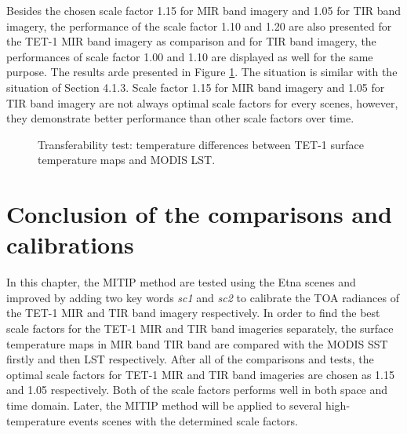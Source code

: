 \noindent Besides the chosen scale factor 1.15 for MIR band imagery and 1.05 for TIR band imagery, the performance of the scale factor 1.10 and 1.20 are also presented for the TET-1 MIR band imagery as comparison and for TIR band imagery, the performances of scale factor 1.00 and 1.10 are displayed as well for the same purpose. The results arde presented in Figure \ref{fig:LST_test}. The situation is similar with the situation of Section 4.1.3. Scale factor 1.15 for MIR band imagery and 1.05 for TIR band imagery are not always optimal scale factors for every scenes, however, they demonstrate better performance than other scale factors over time.\\

\begin{figure}[!htbp]
\centering
{}
\hspace{0.5in}
\caption{Transferability test: temperature differences between TET-1 surface temperature maps and MODIS LST.}
\label{fig:LST_test}
\end{figure}


\section{Conclusion of the comparisons and calibrations}
In this chapter, the MITIP method are tested using the Etna scenes and improved by adding two key words \emph{sc1} and \emph{sc2} to calibrate the TOA radiances of the TET-1 MIR and TIR band imagery respectively. In order to find the best scale factors for the TET-1 MIR and TIR band imageries separately, the surface temperature maps in MIR band TIR band are compared with the MODIS SST firstly and then LST respectively. After all of the comparisons and tests, the optimal scale factors for TET-1 MIR and TIR band imageries are chosen as 1.15 and 1.05 respectively. Both of the scale factors performs well in both space and time domain. Later, the MITIP method will be applied to several high-temperature events scenes with the determined scale factors.\\

